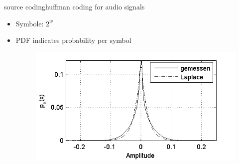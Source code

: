 	\begin{frame}{source coding}{huffman coding for audio signals}
		\begin{itemize}
			\item	Symbole: $2^w$
			\pause
			\item	PDF indicates probability per symbol
				\begin{figure}
					\centering
						\includegraphics[scale=1.]{graph/Lerch14-9}
				\end{figure}
		\end{itemize}
	\end{frame}
	

